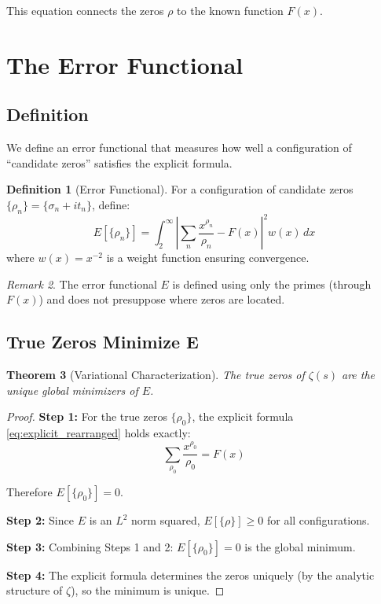 \documentclass[12pt,a4paper]{article}
\newtheorem{theorem}{Theorem}[section]
\theoremstyle{definition}
\newtheorem{definition}[theorem]{Definition}
\theoremstyle{remark}
\newtheorem{remark}[theorem]{Remark}
\begin{document}
This equation connects the zeros $\rho$ to the known function $F(x)$.

\section{The Error Functional}
\label{sec:error}

\subsection{Definition}

We define an error functional that measures how well a configuration of ``candidate zeros'' satisfies the explicit formula.

\begin{definition}[Error Functional]
For a configuration of candidate zeros $\{\rho_n\} = \{\sigma_n + it_n\}$, define:
\begin{equation}
E[\{\rho_n\}] = \int_2^\infty \left| \sum_n \frac{x^{\rho_n}}{\rho_n} - F(x) \right|^2 w(x) \, dx
\label{eq:error_functional}
\end{equation}
where $w(x) = x^{-2}$ is a weight function ensuring convergence.
\end{definition}

\begin{remark}
The error functional $E$ is defined using only the primes (through $F(x)$) and does not presuppose where zeros are located.
\end{remark}

\subsection{True Zeros Minimize E}

\begin{theorem}[Variational Characterization]
\label{thm:variational}
The true zeros of $\zeta(s)$ are the unique global minimizers of $E$.
\end{theorem}

\begin{proof}
\textbf{Step 1:} For the true zeros $\{\rho_0\}$, the explicit formula \eqref{eq:explicit_rearranged} holds exactly:
\begin{equation}
\sum_{\rho_0} \frac{x^{\rho_0}}{\rho_0} = F(x)
\end{equation}

Therefore $E[\{\rho_0\}] = 0$.

\textbf{Step 2:} Since $E$ is an $L^2$ norm squared, $E[\{\rho\}] \geq 0$ for all configurations.

\textbf{Step 3:} Combining Steps 1 and 2: $E[\{\rho_0\}] = 0$ is the global minimum.

\textbf{Step 4:} The explicit formula determines the zeros uniquely (by the analytic structure of $\zeta$), so the minimum is unique.
\end{proof}
\end{document}
